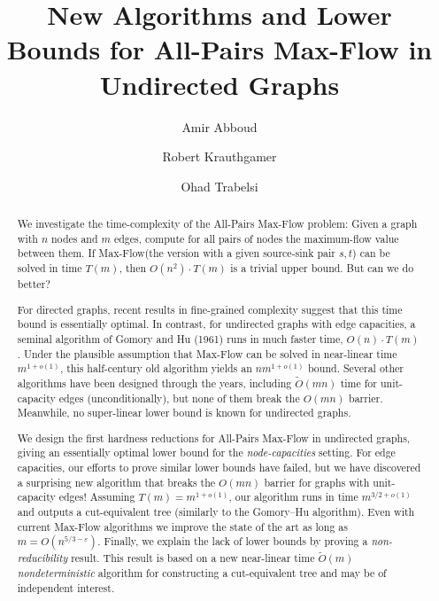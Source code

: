 \documentclass{toc}
\theoremstyle{plain}
\newcommand{\ProblemName}[1]{\textsf{#1}}
\newcommand{\MF}{\ProblemName{Max-Flow}\xspace}
\newcommand{\APMF}{\ProblemName{All-Pairs Max-Flow}\xspace}
\newcommand\tO{\ensuremath{\widetilde O}}  %
\begin{document}
\begin{frontmatter} %

%
%

%
%

\title{New Algorithms and Lower Bounds for All-Pairs Max-Flow in Undirected Graphs}

%
%
%
%
%
%
%
%
%
%
%
%


%
%
%
%

%

\author[abboud]{Amir Abboud}
\author[krauthgamer]{Robert Krauthgamer}
\author[trabelsi]{Ohad Trabelsi}

%
%
%
%

%
%
%
%
%
%
\begin{abstract}
We investigate the time-complexity of the \APMF problem:
Given a graph with $n$ nodes and $m$ edges,
compute for all pairs of nodes the maximum-flow value between them.
If \MF (the version with a given source-sink pair $s,t$) can be solved in time
$T(m)$, then $O(n^2) \cdot T(m)$ is a trivial upper bound.
But can we do better?

For directed graphs, recent results in fine-grained complexity suggest that
this time bound is essentially optimal.
In contrast, for undirected graphs with edge capacities,
a seminal algorithm of Gomory and Hu (1961) runs in much faster
time, %
$O(n)\cdot T(m)$.
Under the plausible assumption that \MF can be solved in near-linear time
$m^{1+o(1)}$, this half-century old algorithm yields an $nm^{1+o(1)}$ bound.
Several other algorithms have been designed through the years,
including %
${\tO}(mn)$    %
time for unit-capacity edges (unconditionally),
but none of them break the $O(mn)$ barrier.
Meanwhile, no super-linear lower bound
%
is known   %
for undirected graphs.

We design the first hardness reductions for \APMF in undirected graphs,
giving an essentially optimal lower bound for the \emph{node-capacities}
setting.
For edge capacities, our efforts to prove similar lower bounds have failed,
but we have discovered a surprising new algorithm
that breaks the $O(mn)$ barrier for graphs with unit-capacity edges!
Assuming $T(m)=m^{1+o(1)}$, our algorithm runs in time $m^{3/2 +o(1)}$ and
outputs a cut-equivalent tree (similarly to the Gomory--Hu algorithm).
Even with current \MF algorithms we improve
the %
%
%
state of the art  %
as long as $m=O(n^{5/3-\varepsilon})$.
Finally, we explain the lack of lower bounds by proving a
\emph{non-reducibility} result.
This result is based on a new near-linear time $\tO(m)$
%
%
\emph{nondeterministic}
algorithm for constructing a cut-equivalent
tree and may be of independent interest.
\end{abstract}

%

\end{frontmatter}
\end{document}
